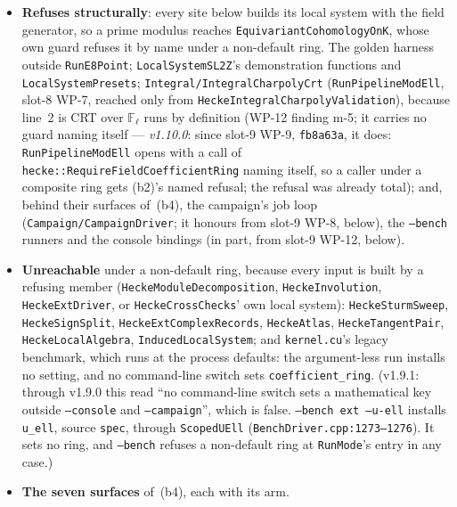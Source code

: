 \documentclass[11pt]{article}
\theoremstyle{remark}
\newcommand{\F}{\mathbb{F}}
\newcommand{\Z}{\mathbb{Z}}
\newcommand{\Fl}{\F_\ell}
\begin{document}
\begin{enumerate}[label=(b\arabic*)]
\begin{itemize}
    $\Z/\ell^k$ or under a non-default setting.
  \item \textbf{Refuses structurally}: every site below builds its local system with the field
    generator, so a prime modulus reaches \texttt{EquivariantCohomologyOnK}, whose own guard
    refuses it by name under a non-default ring. The golden harness outside \texttt{RunE8Point};
    \texttt{LocalSystemSL2Z}'s demonstration functions and \texttt{LocalSystemPresets};
    \texttt{Integral/IntegralCharpolyCrt} (\texttt{RunPipelineModEll}, slot-8 WP-7, reached only
    from \texttt{HeckeIntegralCharpolyValidation}), because line~2 is CRT over $\Fl$ runs by
    definition (WP-12 finding m-5; it carries no guard naming itself --- \emph{v1.10.0}: since
    slot-9 WP-9, \texttt{fb8a63a}, it does: \texttt{RunPipelineModEll} opens with a call of
    \texttt{hecke::RequireFieldCoefficientRing} naming itself, so a caller
    under a composite ring gets (b2)'s named refusal; the refusal was already total); and, behind
    their surfaces of~(b4), the campaign's job loop (\texttt{Campaign/CampaignDriver}; it honours
    from slot-9 WP-8, below), the \texttt{--bench} runners and the console bindings (in part, from
    slot-9 WP-12, below).
  \item \textbf{Unreachable} under a non-default ring, because every input is built by a refusing
    member (\texttt{HeckeModuleDecomposition}, \texttt{HeckeInvolution}, \texttt{HeckeExtDriver},
    or \texttt{HeckeCrossChecks}' own local system): \texttt{HeckeSturmSweep},
    \texttt{HeckeSignSplit}, \texttt{HeckeExtComplexRecords}, \texttt{HeckeAtlas},
    \texttt{HeckeTangentPair}, \texttt{HeckeLocalAlgebra}, \texttt{InducedLocalSystem}; and
    \texttt{kernel.cu}'s legacy benchmark, which runs at the process defaults: the argument-less
    run installs no setting, and no command-line switch sets \texttt{coefficient\_ring}. (v1.9.1:
    through v1.9.0 this read ``no command-line switch sets a mathematical key outside
    \texttt{--console} and \texttt{--campaign}'', which is false. \texttt{--bench ext --u-ell}
    installs \texttt{u\_ell}, source \texttt{spec}, through \texttt{ScopedUEll}
    (\texttt{BenchDriver.cpp:1273--1276}). It sets no ring, and \texttt{--bench} refuses a
    non-default ring at \texttt{RunMode}'s entry in any case.)
  \item \textbf{The seven surfaces} of~(b4), each with its arm.
  \end{itemize}


\end{enumerate}
\end{document}
